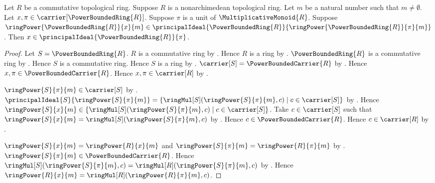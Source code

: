 \begin{theorem}\label{power_bounded_principal_power_kernel}
    Let $R$ be a commutative topological ring.
    Suppose $R$ is a nonarchimedean topological ring.
    Let $m$ be a natural number such that $m\neq\emptyset$.
    Let $x,\pi\in\carrier[\PowerBoundedRing{R}]$.
    Suppose $\pi$ is a unit of $\MultiplicativeMonoid{R}$.
    Suppose $\ringPower{\PowerBoundedRing{R}}{x}{m}
        \in\principalIdeal{\PowerBoundedRing{R}}{
            \ringPower{\PowerBoundedRing{R}}{\pi}{m}}$.
    Then $x\in\principalIdeal{\PowerBoundedRing{R}}{\pi}$.
\end{theorem}
\begin{proof}
    Let $S=\PowerBoundedRing{R}$.
    $R$ is a commutative ring by
        .
    Hence $R$ is a ring by .
    $\PowerBoundedRing{R}$ is a commutative ring by
        .
    Hence $S$ is a commutative ring.
    Hence $S$ is a ring by .
    $\carrier[S]=\PowerBoundedCarrier{R}$ by
        .
    Hence $x,\pi\in\PowerBoundedCarrier{R}$.
    Hence $x,\pi\in\carrier[R]$ by
        .

    $\ringPower{S}{\pi}{m}\in\carrier[S]$ by
        .
    $\principalIdeal{S}{\ringPower{S}{\pi}{m}}
        =\{\ringMul[S](\ringPower{S}{\pi}{m},c)
            \mid c\in\carrier[S]\}$ by
        .
    Hence $\ringPower{S}{x}{m}
        \in\{\ringMul[S](\ringPower{S}{\pi}{m},c)
            \mid c\in\carrier[S]\}$.
    Take $c\in\carrier[S]$ such that
        $\ringPower{S}{x}{m}
            =\ringMul[S](\ringPower{S}{\pi}{m},c)$ by \auto.
    Hence $c\in\PowerBoundedCarrier{R}$.
    Hence $c\in\carrier[R]$ by
        .

    $\ringPower{S}{x}{m}=\ringPower{R}{x}{m}$ and
        $\ringPower{S}{\pi}{m}=\ringPower{R}{\pi}{m}$ by
        .
    $\ringPower{S}{\pi}{m}\in\PowerBoundedCarrier{R}$.
    Hence $\ringMul[S](\ringPower{S}{\pi}{m},c)
        =\ringMul[R](\ringPower{S}{\pi}{m},c)$ by
        .
    Hence $\ringPower{R}{x}{m}
        =\ringMul[R](\ringPower{R}{\pi}{m},c)$.


\end{proof}
